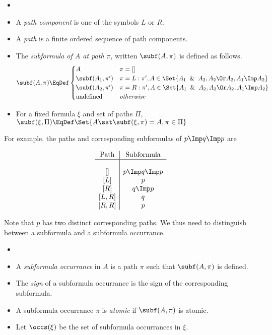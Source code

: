 \begin{definition}[Paths]
  \begin{itemize}
  \item[]
  \item A \emph{path component} is one of the symbols $L$ or $R$.
  \item A \emph{path} is a finite ordered sequence of path components.
  \item The \emph{subformula of $A$ at path $\pi$},
    written $\subf(A, \pi)$ is defined as follows.
    \[
    \subf(A, \pi) \EqDef
    \begin{cases}
      A & \pi = []\\
      \subf(A_1, \pi') & \pi = L : \pi', A\in\Set{A_1\And A_2, A_2\Or A_2, A_1\Imp A_2}\\
      \subf(A_2, \pi') & \pi = R : \pi', A\in\Set{A_1\And A_2, A_2\Or A_2, A_1\Imp A_2}\\
      \mbox{undefined} & \emph{otherwise} \\
    \end{cases}
    \]
  \item For a fixed formula $\xi$ and set of paths $\Pi$,
    $\subf(\xi, \Pi) \EqDef \Set{A\sst\subf(\xi, \pi) = A, \pi\in\Pi}$
  \end{itemize}
\end{definition}

\noindent
For example, the paths and corresponding subformulas of $p \Imp q\Imp p$ are

\[
\begin{array}{c|c}
  \mbox{Path} & \mbox{Subformula} \\
  \hline \\
  \left[\right]  & p\Imp q\Imp p \\
  \left[L\right] & p \\
  \left[R\right] & q\Imp p \\
  \left[L,R\right] & q \\
  \left[R,R\right] & p \\
\end{array}
\]

\noindent
Note that $p$ has two distinct corresponding paths.  We thus need to
distinguish between a subformula and a subformula occurrance.

\begin{definition}
  \begin{itemize}
  \item[]
  \item A \emph{subformula occurrance} in $A$ is a path $\pi$ such that $\subf(A, \pi)$ is
    defined.
  \item The \emph{sign} of a subformula occurrance is the sign of the corresponding
    subformula.
  \item A subformula occurrance $\pi$ is \emph{atomic} if $\subf(A, \pi)$ is
    atomic.
  \item Let $\occs(\xi)$ be the set of subformula occurrances in $\xi$.
  \end{itemize}
\end{definition}

